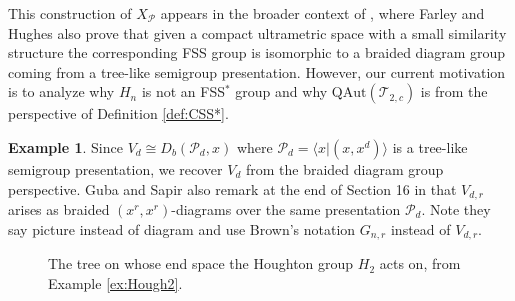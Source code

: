 \documentclass[12pt]{amsart}
\numberwithin{equation}{subsection}
\theoremstyle{definition}
\theoremstyle{definition}
\newtheorem{example}[theorem]{Example}
\theoremstyle{remark}
\begin{document}
    This construction of $X_\mathcal P$ appears in the broader context of \cite{hughes2017braided}, where Farley and Hughes also prove that given a compact ultrametric space with a small similarity structure the corresponding FSS group is isomorphic to a braided diagram group coming from a tree-like semigroup presentation. However, our current motivation is to analyze why $H_n$ is not an FSS$^*$ group and why $\text{QAut}(\mathcal T_{2,c})$ is from the perspective of Definition \ref{def:CSS*}. 



\begin{example}
    Since $V_d \cong D_b(\mathcal P_d,x)$ where $\mathcal P_d = \langle x \vert (x,x^d)\rangle$ is a tree-like semigroup presentation, we recover $V_d$ from the braided diagram group perspective. Guba and Sapir also remark at the end of Section 16 in \cite{GubaSapir1997} that $V_{d,r}$ arises as braided $(x^r,x^r)$-diagrams over the same presentation $\mathcal P_d$. Note they say picture instead of diagram and use Brown's notation $G_{n,r}$ instead of $V_{d,r}$.
    
\end{example}


\begin{figure}
\centering
{}
\caption[The tree on whose end space the Houghton group $H_2$ acts on.]{The tree on whose end space the Houghton group $H_2$ acts on, from Example \ref{ex:Hough2}.}
\label{fig:Houghton2}
\end{figure}
\end{document}
